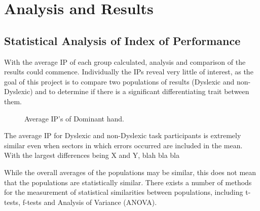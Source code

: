 \section{Analysis and Results}
	\subsection{Statistical Analysis of Index of Performance}
		With the average IP of each group calculated, analysis and comparison of the results could  commence. Individually the IPs reveal very little of interest, as the goal of this project is to compare two populations of results (Dyslexic and non-Dyslexic) and to determine if there is a significant differentiating trait between them.
		
		\begin{figure}[h]
		\centering
		\hfil
		\caption{Average IP's of Dominant hand.}
		\label{fig_ray_traced_images}
	\end{figure}
	
		
		The average IP for Dyslexic and non-Dyslexic task participants is extremely similar even when sectors in which errors occurred are included in the mean. With the largest differences being X and Y, blah bla bla

		While the overall averages of the populations may be similar, this does not mean that the populations are statistically similar. There exists a number of methods for the measurement of statistical similarities between populations, including t-tests, f-tests and Analysis of Variance (ANOVA).

